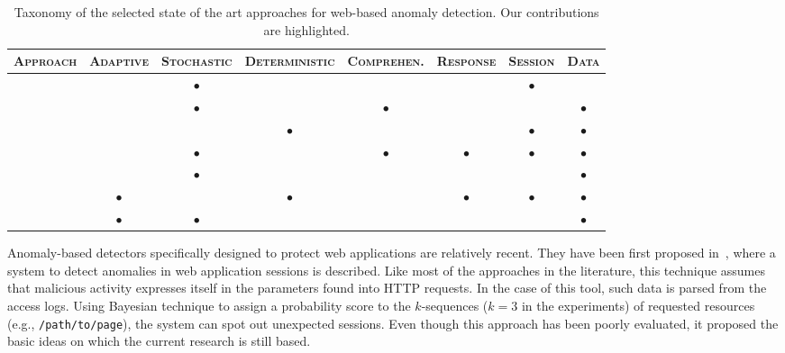 \begin{table}
  \renewcommand{\arraystretch}{1.5} \centering
  \begin{tabular}{rccccccc}
    \toprule
    
    \textsc{Approach} & \textsc{Adaptive} &
    \textsc{Stochastic} & \textsc{Deterministic} & \textsc{Comprehen.}
    & \textsc{Response} & \textsc{Session} & \textsc{Data} \\

    \midrule

    \citep{cho:cs2004:anomaly} & & $\bullet$ & & & & $\bullet$ & \\

    \citep{kruegel:jcn2005:webanomaly} & & $\bullet$ & & $\bullet$ & &
    & $\bullet$ \\

    \citep{ingham:2007:dfa} & & & $\bullet$ & & & $\bullet$ & $\bullet$ \\
    
    \citep{masibty} & & $\bullet$ & & $\bullet$ & $\bullet$ & $\bullet$ & $\bullet$ \\


    \citep{song2009smm} & & $\bullet$ & & & & & $\bullet$ \\


    \textbf{\citep{2009_maggi_robertson_kruegel_vigna}}
                                          & $\bullet$ & & $\bullet$ &
    & $\bullet$ & $\bullet$ & $\bullet$ \\


    \textbf{\citep{2009_robertson_maggi_kruegel_vigna}} & $\bullet$ & $\bullet$ & &
    & & & $\bullet$ \\

    \bottomrule
  \end{tabular}
  \caption{Taxonomy of the selected state of the art approaches for
  web-based anomaly detection. Our contributions are highlighted.}
  \label{tab:web-sota-taxonomy}
\end{table}

Anomaly-based detectors specifically designed to protect web
applications are relatively recent. They have been first proposed
in~\citep{cho:cs2004:anomaly}, where a system to detect anomalies in
web application sessions is described. Like most of the approaches in
the literature, this technique assumes that malicious activity
expresses itself in the parameters found into \ac{HTTP}
requests. In the case of this tool, such data is parsed from the
access logs. Using Bayesian technique to assign a probability score to
the $k$-sequences ($k = 3$ in the experiments) of requested resources
(e.g., \texttt{/path/to/page}), the system can spot out unexpected
sessions. Even though this approach has been poorly evaluated, it
proposed the basic ideas on which the current research is still based.

